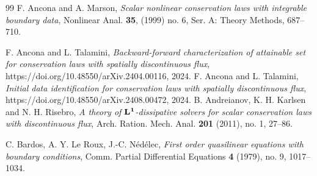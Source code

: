 \documentclass[a4paper, 10pt, final]{article}
\begin{document}
\begin{thebibliography}{99}
 F. Ancona and A. Marson, \textsl{Scalar nonlinear conservation laws with integrable boundary data}, 
Nonlinear Anal. \textbf{35}, (1999) no. 6, Ser. A: Theory Methods,  687--710.
%

F. Ancona and L. Talamini,
\textsl{Backward-forward characterization of attainable set for conservation laws
with spatially discontinuous flux}, 
https://doi.org/10.48550/arXiv.2404.00116, 2024.
%
%
F. Ancona and L. Talamini,
\textsl{Initial data identification for conservation laws
with spatially discontinuous flux}, 
https://doi.org/10.48550/arXiv.2408.00472, 2024.
%
%   
%
%
%
 B.  Andreianov, K. H. Karlsen and N. H. Risebro, \textsl{A theory of ${\bf L^1}$-dissipative solvers for scalar conservation laws with discontinuous flux},  Arch. Ration. Mech. Anal. \textbf{201} (2011), no. 1, 27--86.


 C. Bardos, A. Y. Le Roux, J.-C. N\'ed\'elec, \textsl{First
   order quasilinear equations with boundary conditions},
 Comm. Partial Differential Equations \textbf{4} (1979), no. 9,
 1017--1034.

% 


\end{thebibliography}
\end{document}

